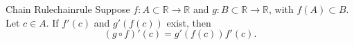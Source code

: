 
\begin{thm}{Chain Rule}{chainrule}
	Suppose \(f\colon A \subset \mathbb{R} \to \mathbb{R}\) and \(g\colon B \subset \mathbb{R} \to \mathbb{R}\), with \(f(A) \subset B\). Let \(c \in A\). If \(f'(c)\) and \(g'(f(c))\) exist, then \[
		(g\circ f)'(c) = g'(f(c)) f'(c).
	\]
\end{thm}

%
%
%
%
%
%
%
%			
%
%
%

